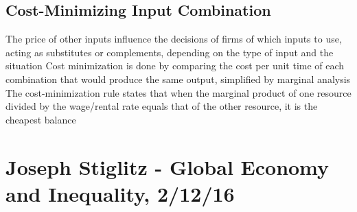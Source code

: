 \documentclass[11 pt, twoside]{article}
\newenvironment{outline*}
{
	\begin{outline}[enumerate]
	}
	{\end{outline}
}
\begin{document}
\subsection{Cost-Minimizing Input Combination}
\begin{outline*}
\1 The price of other inputs influence the decisions of firms of which inputs to use, acting as substitutes or complements, depending on the type of input and the situation
\1 Cost minimization is done by comparing the cost per unit time of each combination that would produce the same output, simplified by marginal analysis
\2 The cost-minimization rule states that when the marginal product of one resource divided by the wage/rental rate equals that of the other resource, it is the cheapest balance
\end{outline*}
\section{Joseph Stiglitz - Global Economy and Inequality, 2/12/16}
\end{document}

